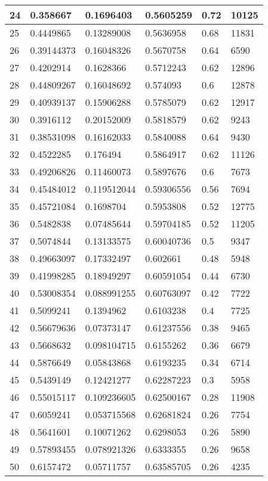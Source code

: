 \begin{longtable}{|l|l|l|l|l|l|}
24 & 0.358667 & 0.1696403 & 0.5605259 & 0.72 & 10125 \\ \hline 
25 & 0.4449865 & 0.13289008 & 0.5636958 & 0.68 & 11831 \\ \hline 
26 & 0.39144373 & 0.16048326 & 0.5670758 & 0.64 & 6590 \\ \hline 
27 & 0.4202914 & 0.1628366 & 0.5712243 & 0.62 & 12896 \\ \hline 
28 & 0.44809267 & 0.16048692 & 0.574093 & 0.6 & 12878 \\ \hline 
29 & 0.40939137 & 0.15906288 & 0.5785079 & 0.62 & 12917 \\ \hline 
30 & 0.3916112 & 0.20152009 & 0.5818579 & 0.62 & 9243 \\ \hline 
31 & 0.38531098 & 0.16162033 & 0.5840088 & 0.64 & 9430 \\ \hline 
32 & 0.4522285 & 0.176494 & 0.5864917 & 0.62 & 11126 \\ \hline 
33 & 0.49206826 & 0.11460073 & 0.5897676 & 0.6 & 7673 \\ \hline 
34 & 0.45484012 & 0.119512044 & 0.59306556 & 0.56 & 7694 \\ \hline 
35 & 0.45721084 & 0.1698704 & 0.5953808 & 0.52 & 12775 \\ \hline 
36 & 0.5482838 & 0.07485644 & 0.59704185 & 0.52 & 11205 \\ \hline 
37 & 0.5074844 & 0.13133575 & 0.60040736 & 0.5 & 9347 \\ \hline 
38 & 0.49663097 & 0.17332497 & 0.602661 & 0.48 & 5948 \\ \hline 
39 & 0.41998285 & 0.18949297 & 0.60591054 & 0.44 & 6730 \\ \hline 
40 & 0.53008354 & 0.088991255 & 0.60763097 & 0.42 & 7722 \\ \hline 
41 & 0.5099241 & 0.1394962 & 0.6103238 & 0.4 & 7725 \\ \hline 
42 & 0.56679636 & 0.07373147 & 0.61237556 & 0.38 & 9465 \\ \hline 
43 & 0.5668632 & 0.098104715 & 0.6155262 & 0.36 & 6679 \\ \hline 
44 & 0.5876649 & 0.05843868 & 0.6193235 & 0.34 & 6714 \\ \hline 
45 & 0.5439149 & 0.12421277 & 0.62287223 & 0.3 & 5958 \\ \hline 
46 & 0.55015117 & 0.109236605 & 0.62500167 & 0.28 & 11908 \\ \hline 
47 & 0.6059241 & 0.053715568 & 0.62681824 & 0.26 & 7754 \\ \hline 
48 & 0.5641601 & 0.10071262 & 0.6298053 & 0.26 & 5890 \\ \hline 
49 & 0.57893455 & 0.078921326 & 0.6333355 & 0.26 & 9658 \\ \hline 
50 & 0.6157472 & 0.05711757 & 0.63585705 & 0.26 & 4235 \\ \hline 
\end{longtable}